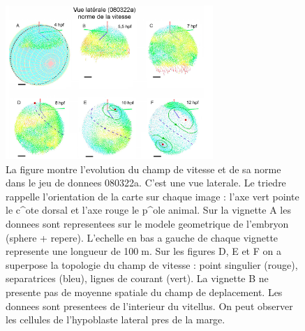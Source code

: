 \begin{figure}
\begin{center}
\includegraphics[width=0.7\textwidth]{../../images/Reconstruction/these_lombardot/p166_velocity_map.png}
\end{center}
\caption{La figure montre l'evolution du champ de vitesse et de sa norme dans le jeu de donnees 080322a. C'est une vue laterale. Le triedre rappelle l'orientation de la carte sur chaque image : l'axe vert pointe le c^ote dorsal et l'axe rouge le p^ole animal. Sur la vignette A les donnees sont representees sur le modele geometrique de l'embryon (sphere + repere). L'echelle en bas a gauche de chaque vignette represente une longueur de 100m. Sur les figures D, E et F on a superpose la topologie du champ de vitesse : point singulier (rouge), separatrices (bleu), lignes de courant (vert). La vignette B ne presente pas de moyenne spatiale du champ de deplacement. Les donnees sont presentees de l'interieur du vitellus. On peut observer les cellules de l'hypoblaste lateral pres de la marge.}
\label{these_lombardot_p166_velocity_map}
\end{figure}
